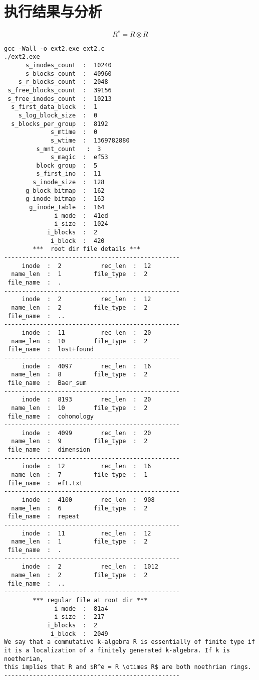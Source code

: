 \documentclass[UTF8]{ctexart}
\begin{document}
\section{执行结果与分析}
$$R^e = R \otimes R$$
\begin{verbatim}
gcc -Wall -o ext2.exe ext2.c
./ext2.exe
      s_inodes_count  :  10240
      s_blocks_count  :  40960
    s_r_blocks_count  :  2048
 s_free_blocks_count  :  39156
 s_free_inodes_count  :  10213
  s_first_data_block  :  1
    s_log_block_size  :  0
  s_blocks_per_group  :  8192
             s_mtime  :  0
             s_wtime  :  1369782880
         s_mnt_count   :  3
             s_magic  :  ef53
         block group  :  5
         s_first_ino  :  11
        s_inode_size  :  128
      g_block_bitmap  :  162
      g_inode_bitmap  :  163
       g_inode_table  :  164
              i_mode  :  41ed
              i_size  :  1024
            i_blocks  :  2
             i_block  :  420
        ***  root dir file details ***
-------------------------------------------------
     inode  :  2           rec_len  :  12
  name_len  :  1         file_type  :  2
 file_name  :  .
-------------------------------------------------
     inode  :  2           rec_len  :  12
  name_len  :  2         file_type  :  2
 file_name  :  ..
-------------------------------------------------
     inode  :  11          rec_len  :  20
  name_len  :  10        file_type  :  2
 file_name  :  lost+found
-------------------------------------------------
     inode  :  4097        rec_len  :  16
  name_len  :  8         file_type  :  2
 file_name  :  Baer_sum
-------------------------------------------------
     inode  :  8193        rec_len  :  20
  name_len  :  10        file_type  :  2
 file_name  :  cohomology
-------------------------------------------------
     inode  :  4099        rec_len  :  20
  name_len  :  9         file_type  :  2
 file_name  :  dimension
-------------------------------------------------
     inode  :  12          rec_len  :  16
  name_len  :  7         file_type  :  1
 file_name  :  eft.txt
-------------------------------------------------
     inode  :  4100        rec_len  :  908
  name_len  :  6         file_type  :  2
 file_name  :  repeat
-------------------------------------------------
     inode  :  11          rec_len  :  12
  name_len  :  1         file_type  :  2
 file_name  :  .
-------------------------------------------------
     inode  :  2           rec_len  :  1012
  name_len  :  2         file_type  :  2
 file_name  :  ..
-------------------------------------------------
        *** regular file at root dir ***
              i_mode  :  81a4
              i_size  :  217
            i_blocks  :  2
             i_block  :  2049
We say that a commutative k-algebra R is essentially of finite type if
it is a localization of a finitely generated k-algebra. If k is noetherian,
this implies that R and $R^e = R \otimes R$ are both noethrian rings.
-------------------------------------------------
\end{verbatim}
\end{document}
